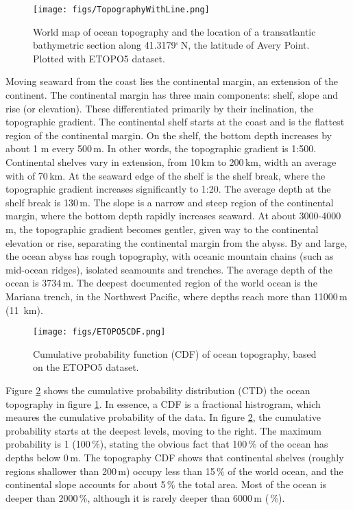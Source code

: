 \documentclass[11pt]{article}
\begin{document}
\begin{figure}[ht]
\centering
\texttt{[image: figs/TopographyWithLine.png]}\\
\caption{\small World map of ocean topography and the location of a transatlantic bathymetric section along 41.3179$^\circ$\,N, the latitude of Avery Point. Plotted with ETOPO5 dataset. }
\label{ETOPO}
\end{figure}

Moving seaward from the coast lies the continental margin, an extension of the continent.
The continental margin has three main components: shelf, slope and rise (or elevation). These differentiated primarily by
their inclination, the topographic gradient. The continental shelf starts at the coast and is the
flattest region of the continental margin. On the shelf, the bottom depth increases by about 1 m
every 500\,m. In other words, the topographic gradient is 1:500. Continental shelves vary in extension, from 10\,km to 200\,km, width an average with
of 70\,km. At the seaward edge of the shelf is the shelf break, where the topographic gradient increases
significantly to 1:20. The average depth at the shelf break is 130\,m. The slope is a narrow and steep region of the continental margin, where the bottom depth rapidly increases seaward. At about 3000-4000\,m, the topographic gradient becomes gentler, given way to the continental elevation or rise, separating the
continental margin from the abyss. By and large, the ocean abyss has rough topography, with oceanic mountain chains (such as mid-ocean ridges), isolated seamounts and trenches. The average depth of the ocean is 3734\,m. The deepest documented region of the world ocean is the Mariana trench,
in the Northwest Pacific, where depths reach more than 11000\,m (11\, km).

\begin{figure}[ht]
\centering
\texttt{[image: figs/ETOPO5CDF.png]}
\caption{\small Cumulative probability function (CDF) of ocean topography, based on the ETOPO5 dataset.}
\label{ETOPOCDF}
\end{figure}

Figure \ref{ETOPOCDF} shows the cumulative probability distribution (CTD) the ocean
topography in figure \ref{ETOPO}. In essence, a CDF is a fractional histrogram, which
meaures the cumulative probability of the data.  In figure \ref{ETOPOCDF}, the cumulative
probability starts at the deepest levels, moving to the right. The maximum probability is
1 (100\,\%), stating the obvious fact that 100\,\% of the ocean has depths below 0\,m. The topography CDF
shows that continental shelves (roughly regions shallower than 200\,m) occupy less than 15\,\% of
the world ocean, and the continental slope accounts for about 5\,\% the total area. Most of the ocean
is deeper than 2000\,\%, although it is rarely deeper than 6000\,m (\,\%).
\end{document}
